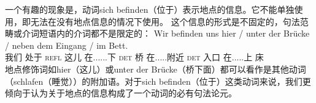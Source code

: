 一个有趣的现象是，动词sich befinden（位于）表示地点的信息。它不能单独使用，即无法在没有地点信息的情况下使用。
\z
这个信息的形式是不固定的，句法范畴或介词短语内的介词都不是限定的：
\ea
\gll Wir befinden uns hier / unter der Brücke / neben dem Eingang / im Bett.\\
	 我们 处于 \textsc{refl} 这儿 {} 在......下 \textsc{det} 桥 {} 在.....附近 \textsc{det} 入口 {} 在.....上 床\\
\z
地点修饰词如hier（这儿）或unter der Brücke（桥下面）都可以看作是其他动词（\egc schlafen（睡觉））的附加语。对于sich befinden（位于）这类动词来说，我们更倾向于认为关于地点的信息构成了一个动词的必有句法论元。
%
%
